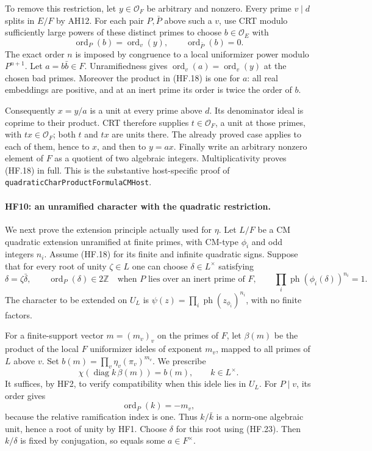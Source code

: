 To remove this restriction, let $y\in\mathcal O_F$ be arbitrary
and nonzero. Every prime $v\mid d$ splits in $E/F$ by AH12.
For each pair $P,\bar P$ above such a $v$, use CRT modulo
sufficiently large powers of these distinct primes to choose
$b\in\mathcal O_E$ with
\[
 \operatorname{ord}_P(b)=\operatorname{ord}_v(y),
                    \qquad\operatorname{ord}_{\bar P}(b)=0.
 \tag{HF.22}
\]
The exact order $n$ is imposed by congruence to a local
uniformizer power modulo $P^{n+1}$. Let $a=b\bar b\in F$.
Unramifiedness gives
$\operatorname{ord}_v(a)=\operatorname{ord}_v(y)$ at the
chosen bad primes. Moreover the product in (HF.18) is one
for $a$: all real embeddings are positive, and at an inert
prime its order is twice the order of $b$.

Consequently $x=y/a$ is a unit at every prime above $d$.
Its denominator ideal is coprime to their product. CRT
therefore supplies $t\in\mathcal O_F$, a unit at those
primes, with $tx\in\mathcal O_F$; both $t$ and $tx$ are
units there. The already proved case applies to each of
them, hence to $x$, and then to $y=ax$. Finally write an
arbitrary nonzero element of $F$ as a quotient of two
algebraic integers. Multiplicativity proves (HF.18) in
full. This is the substantive host-specific proof of
\texttt{quadraticCharProductFormulaCMHost}.

\paragraph{HF10: an unramified character with the quadratic restriction.}
We next prove the extension principle actually used for
$\eta$. Let $L/F$ be a CM quadratic extension unramified at
finite primes, with CM-type $\phi_i$ and odd integers $n_i$.
Assume (HF.18) for its finite and infinite quadratic signs.
Suppose that for every root of unity $\zeta\in L$ one can
choose $\delta\in L^\times$ satisfying
\[
 \delta=\zeta\bar\delta,\qquad
 \operatorname{ord}_P(\delta)\in2\mathbb Z
       \quad\text{when }P\text{ lies over an inert prime of }F,
 \qquad
 \prod_i\operatorname{ph}(\phi_i(\delta))^{n_i}=1.
 \tag{HF.23}
\]
The character to be extended on $U_L$ is
$\psi(z)=\prod_i\operatorname{ph}(z_{\phi_i})^{n_i}$,
with no finite factors.

For a finite-support vector $m=(m_v)_v$ on the primes of
$F$, let $\beta(m)$ be the product of the local $F$
uniformizer ideles of exponent $m_v$, mapped to all
primes of $L$ above $v$. Set
$b(m)=\prod_v\eta_v(\pi_v)^{m_v}$.
We prescribe
\[
 \chi(\operatorname{diag}k\,\beta(m))=b(m),
          \qquad k\in L^\times.                      \tag{HF.24}
\]
It suffices, by HF2, to verify compatibility when this
idele lies in $U_L$. For $P\mid v$, its order gives
\[
                    \operatorname{ord}_P(k)=-m_v,
 \tag{HF.25}
\]
because the relative ramification index is one. Thus
$k/\bar k$ is a norm-one algebraic unit, hence a root
of unity by HF1. Choose $\delta$ for this root using
(HF.23). Then $k/\delta$ is fixed by conjugation,
so equals some $a\in F^\times$.

